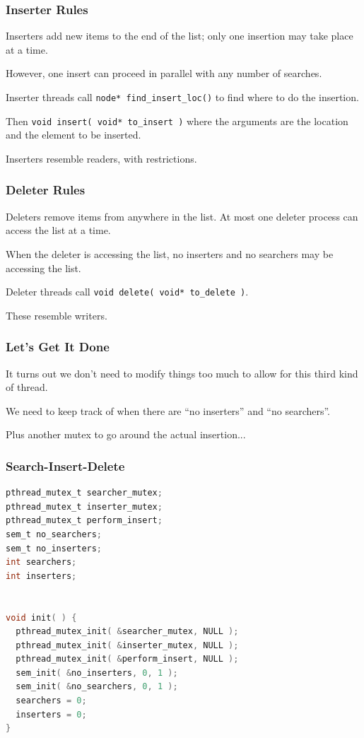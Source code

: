 \begin{frame}
\frametitle{Inserter Rules}

\alert{Inserters} add new items to the end of the list; only one insertion may take place at a time. 

However, one insert can proceed in parallel with any number of searches.

Inserter threads call \texttt{node* find\_insert\_loc()} to find where to do the insertion.

Then \texttt{void insert( void* to\_insert )} where the arguments are the location and the element to be inserted.

Inserters resemble readers, with restrictions.

\end{frame}


\begin{frame}
\frametitle{Deleter Rules}

\alert{Deleters} remove items from anywhere in the list. At most one deleter process can access the list at a time.

When the deleter is accessing the list, no inserters and no searchers may be accessing the list. 

Deleter threads call \texttt{void delete( void* to\_delete )}.

These resemble writers.

\end{frame}


\begin{frame}
\frametitle{Let's Get It Done}

It turns out we don't need to modify things too much to allow for this third kind of thread. 

We need to keep track of when there are ``no inserters'' and ``no searchers''.

Plus another mutex to go around the actual insertion...

\end{frame}


\begin{frame}[fragile]
\frametitle{Search-Insert-Delete}
\begin{lstlisting}[language=C]
pthread_mutex_t searcher_mutex;
pthread_mutex_t inserter_mutex;
pthread_mutex_t perform_insert;
sem_t no_searchers;
sem_t no_inserters;
int searchers;
int inserters;


void init( ) {
  pthread_mutex_init( &searcher_mutex, NULL );
  pthread_mutex_init( &inserter_mutex, NULL );
  pthread_mutex_init( &perform_insert, NULL );
  sem_init( &no_inserters, 0, 1 );
  sem_init( &no_searchers, 0, 1 );
  searchers = 0;
  inserters = 0;
}
\end{lstlisting}
\end{frame}

